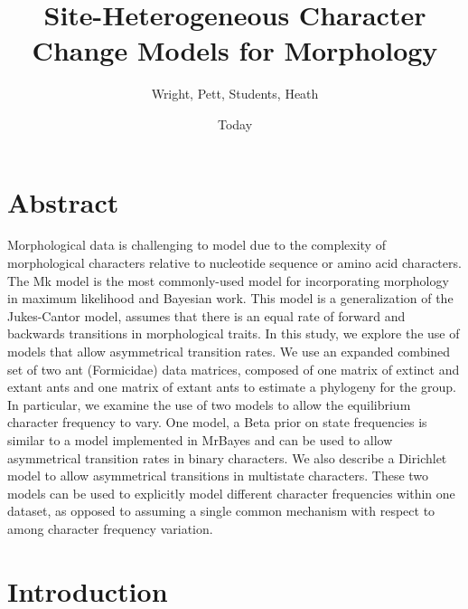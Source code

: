 \documentclass[]{article}
\begin{document}
\title{Site-Heterogeneous Character Change Models for Morphology}
\author{Wright, Pett, Students, Heath}
\date{Today}
\maketitle

\section{Abstract}

Morphological data is challenging to model due to the complexity of morphological characters relative to nucleotide sequence or amino acid characters. 
The Mk model is the most commonly-used model for incorporating morphology in maximum likelihood and Bayesian work.
This model is a generalization of the Jukes-Cantor model, assumes that there is an equal rate of forward and backwards transitions in morphological traits.
In this study, we explore the use of models that allow asymmetrical transition rates.
We use an expanded combined set of two ant (Formicidae) data matrices, composed of one matrix of extinct and extant ants and one matrix of extant ants to estimate a phylogeny for the group.
In particular, we examine the use of two models to allow the equilibrium character frequency to vary. 
One model, a Beta prior on state frequencies is similar to a model implemented in MrBayes and can be used to allow asymmetrical transition rates in binary characters.
We also describe a Dirichlet model to allow asymmetrical transitions in multistate characters.
These two models can be used to explicitly model different character frequencies within one dataset, as opposed to assuming a single common mechanism with respect to among character frequency variation.

\section{Introduction}
\end{document}
